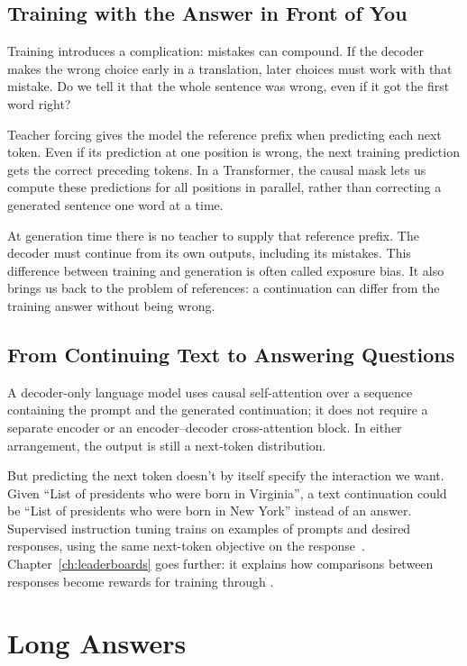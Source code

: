 \subsection{Training with the Answer in Front of You}

Training introduces a complication: mistakes can compound.  If the decoder makes the wrong choice early in a translation, later choices must work with that mistake.  Do we tell it that the whole sentence was wrong, even if it got the first word right?

Teacher forcing gives the model the reference prefix when predicting each next token.  Even if its prediction at one position is wrong, the next training prediction gets the correct preceding tokens.  In a Transformer, the causal mask lets us compute these predictions for all positions in parallel, rather than correcting a generated sentence one word at a time.

At generation time there is no teacher to supply that reference prefix.  The decoder must continue from its own outputs, including its mistakes.  This difference between training and generation is often called exposure bias.  It also brings us back to the problem of references: a continuation can differ from the training answer without being wrong.

\subsection{From Continuing Text to Answering Questions}

A decoder-only language model uses causal self-attention over a sequence containing the prompt and the generated continuation; it does not require a separate encoder or an encoder--decoder cross-attention block.  In either arrangement, the output is still a next-token distribution.

But predicting the next token doesn't by itself specify the interaction we want.  Given ``List of presidents who were born in Virginia'', a text continuation could be ``List of presidents who were born in New York'' instead of an answer.  Supervised instruction tuning trains on examples of prompts and desired responses, using the same next-token objective on the response~\citep{ouyang-22}.  Chapter~\ref{ch:leaderboards} goes further: it explains how comparisons between responses become rewards for training through .

\section{Long Answers}
\label{sec:methods:long-answers}


